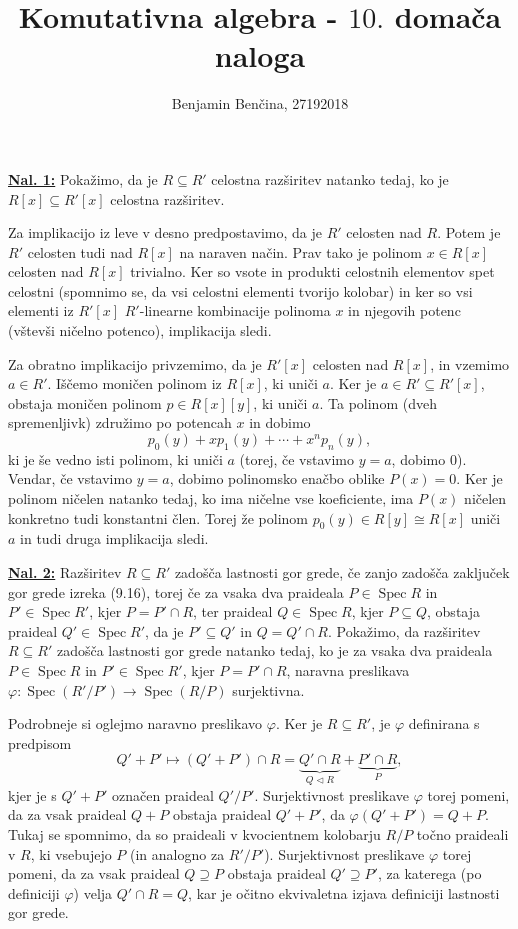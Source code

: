 \documentclass[a4paper, 12pt]{article}
\title{Komutativna algebra - $10.$ domača naloga}
\author{Benjamin Benčina, 27192018}
\DeclareMathOperator{\Spec}{Spec}
\newcommand{\iso}{\cong}
\newcommand{\subideal}{\vartriangleleft}
\begin{document}
\maketitle

\underline{\textbf{Nal. 1:}}
Pokažimo, da je $R \subseteq R'$ celostna razširitev natanko tedaj, ko je $R[x] \subseteq R'[x]$ celostna razširitev.

Za implikacijo iz leve v desno predpostavimo, da je $R'$ celosten nad $R$. Potem je $R'$ celosten tudi nad $R[x]$ na naraven način. Prav tako je polinom $x \in R[x]$ celosten nad $R[x]$ trivialno. Ker so vsote in produkti celostnih elementov spet celostni (spomnimo se, da vsi celostni elementi tvorijo kolobar) in ker so vsi elementi iz $R'[x]$ $R'$-linearne kombinacije polinoma $x$ in njegovih potenc (vštevši ničelno potenco), implikacija sledi.

Za obratno implikacijo privzemimo, da je $R'[x]$ celosten nad $R[x]$, in vzemimo $a \in R'$. Iščemo moničen polinom iz $R[x]$, ki uniči $a$. Ker je $a \in R' \subseteq R'[x]$, obstaja moničen polinom $p \in R[x][y]$, ki uniči $a$. Ta polinom (dveh spremenljivk) združimo po potencah $x$ in dobimo
\[
p_0(y) + x p_1(y) + \cdots + x^np_n(y),
\]
ki je še vedno isti polinom, ki uniči $a$ (torej, če vstavimo $y = a$, dobimo $0$). Vendar, če vstavimo $y = a$, dobimo polinomsko enačbo oblike $P(x) = 0$. Ker je polinom ničelen natanko tedaj, ko ima ničelne vse koeficiente, ima $P(x)$ ničelen konkretno tudi konstantni člen. Torej že polinom $p_0(y) \in R[y] \iso R[x]$ uniči $a$ in tudi druga implikacija sledi.
\newline

\underline{\textbf{Nal. 2:}}
Razširitev $R \subseteq R'$ zadošča lastnosti gor grede, če zanjo zadošča zaključek gor grede izreka (9.16), torej če za vsaka dva praideala $P \in \Spec R$ in $P' \in \Spec R'$, kjer $P = P' \cap R$, ter praideal $Q \in \Spec R$, kjer $P \subseteq Q$, obstaja praideal $Q' \in \Spec R'$, da je $P' \subseteq Q'$ in $Q = Q' \cap R$.
Pokažimo, da razširitev $R \subseteq R'$ zadošča lastnosti gor grede natanko tedaj, ko je za vsaka dva praideala $P \in \Spec R$ in $P' \in \Spec R'$, kjer $P = P' \cap R$, naravna preslikava $\varphi \colon \Spec (R'/P') \to \Spec (R/P)$ surjektivna.

Podrobneje si oglejmo naravno preslikavo $\varphi$. Ker je $R\subseteq R'$, je $\varphi$ definirana s predpisom
\[
Q' + P' \mapsto (Q' + P') \cap R = \underbrace{Q' \cap R}_{Q \subideal R} + \underbrace{P' \cap R}_P,
\]
kjer je s $Q' + P'$ označen praideal $Q'/P'$.
Surjektivnost preslikave $\varphi$ torej pomeni, da za vsak praideal $Q + P$ obstaja praideal $Q' + P'$, da $\varphi(Q' + P') = Q + P$.
Tukaj se spomnimo, da so praideali v kvocientnem kolobarju $R/P$ točno praideali v $R$, ki vsebujejo $P$ (in analogno za $R'/P'$).
Surjektivnost preslikave $\varphi$ torej pomeni, da za vsak praideal $Q \supseteq P$ obstaja praideal $Q' \supseteq P'$, za katerega (po definiciji $\varphi$) velja $Q' \cap R = Q$, kar je očitno ekvivaletna izjava definiciji lastnosti gor grede.
\end{document}
